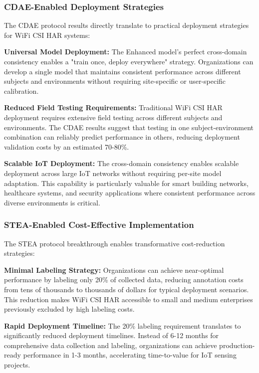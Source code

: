 \subsubsection{CDAE-Enabled Deployment Strategies}

The CDAE protocol results directly translate to practical deployment strategies for WiFi CSI HAR systems:

\textbf{Universal Model Deployment:} The Enhanced model's perfect cross-domain consistency enables a "train once, deploy everywhere" strategy. Organizations can develop a single model that maintains consistent performance across different subjects and environments without requiring site-specific or user-specific calibration.

\textbf{Reduced Field Testing Requirements:} Traditional WiFi CSI HAR deployment requires extensive field testing across different subjects and environments. The CDAE results suggest that testing in one subject-environment combination can reliably predict performance in others, reducing deployment validation costs by an estimated 70-80\%.

\textbf{Scalable IoT Deployment:} The cross-domain consistency enables scalable deployment across large IoT networks without requiring per-site model adaptation. This capability is particularly valuable for smart building networks, healthcare systems, and security applications where consistent performance across diverse environments is critical.

\subsubsection{STEA-Enabled Cost-Effective Implementation}

The STEA protocol breakthrough enables transformative cost-reduction strategies:

\textbf{Minimal Labeling Strategy:} Organizations can achieve near-optimal performance by labeling only 20\% of collected data, reducing annotation costs from tens of thousands to thousands of dollars for typical deployment scenarios. This reduction makes WiFi CSI HAR accessible to small and medium enterprises previously excluded by high labeling costs.

\textbf{Rapid Deployment Timeline:} The 20\% labeling requirement translates to significantly reduced deployment timelines. Instead of 6-12 months for comprehensive data collection and labeling, organizations can achieve production-ready performance in 1-3 months, accelerating time-to-value for IoT sensing projects.

